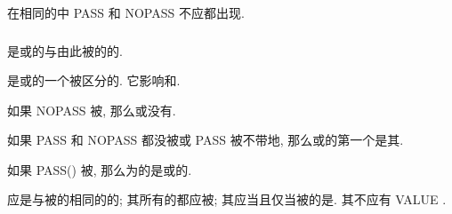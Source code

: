 在相同的\tit{\Procedure{}\Component{}\Attribute{}\Specifier{}\List{}}中 PASS 和 NOPASS 不应都出现.

\subsubsection{\PassedObjectDummyArgument{}}

\PassedObjectDummyArgument{}是\TypeBoundProcedure{}或\Procedure{}\Pointer{}\Component{}的与\Procedure{}由此被\Invoke{}的\Object{}\Associate{}的\DummyArgument{}.

\PassedObjectDummyArgument{}是\Procedure{}\Pointer{}\Component{}或\TypeBoundProcedure{}的一个被区分的\DummyArgument{}. 它影响\Procedure{}\Override{}和\ArgumentAssociation{}.

如果 NOPASS 被\Specify{}, 那么\Procedure{}\Pointer{}\Component{}或\TypeBoundProcedure{}没有\PassedObjectDummyArgument{}.

如果 PASS 和 NOPASS 都没被\Specify{}或 PASS 被不带\tit{\Argument{}\Name{}}地\Specify{}, 那么\Procedure{}\Pointer{}\Component{}或\TypeBoundProcedure{}的第一个\DummyArgument{}是其\PassedObjectDummyArgument{}.

如果 PASS(\tit{\Argument{}\Name{}}) 被\Specify{}, 那么\Name{}为\tit{\Argument{}\Name{}}的\DummyArgument{}是\Procedure{}\Pointer{}\Component{}或\Named{}\TypeBoundProcedure{}的\PassedObjectDummyArgument{}.

\PassedObjectDummyArgument{}应是与被\Define{}的\Type{}相同的的\Scalar{}\Nonpointer{}\Nonallocatable{}\Dummy{}\Data{}\Object{}; 其所有的\Length{}\TypeParameter{}都应被\Assume{}; 其应\Polymorphic{}当且仅当被\Define{}的\Type{}是\ExtensibleType{}. 其不应有 VALUE \Attribute{}.
